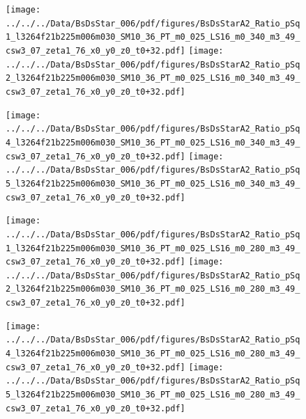 \documentclass[a4paper,10pt]{article}
\begin{document}
\begin{figure}[p]
 \texttt{[image: ../../../Data/BsDsStar\_006/pdf/figures/BsDsStarA2\_Ratio\_pSq1\_l3264f21b225m006m030\_SM10\_36\_PT\_m0\_025\_LS16\_m0\_340\_m3\_49\_csw3\_07\_zeta1\_76\_x0\_y0\_z0\_t0+32.pdf]} 
 \texttt{[image: ../../../Data/BsDsStar\_006/pdf/figures/BsDsStarA2\_Ratio\_pSq2\_l3264f21b225m006m030\_SM10\_36\_PT\_m0\_025\_LS16\_m0\_340\_m3\_49\_csw3\_07\_zeta1\_76\_x0\_y0\_z0\_t0+32.pdf]} 
 \end{figure}
\begin{figure}[p]
 \texttt{[image: ../../../Data/BsDsStar\_006/pdf/figures/BsDsStarA2\_Ratio\_pSq4\_l3264f21b225m006m030\_SM10\_36\_PT\_m0\_025\_LS16\_m0\_340\_m3\_49\_csw3\_07\_zeta1\_76\_x0\_y0\_z0\_t0+32.pdf]} 
 \texttt{[image: ../../../Data/BsDsStar\_006/pdf/figures/BsDsStarA2\_Ratio\_pSq5\_l3264f21b225m006m030\_SM10\_36\_PT\_m0\_025\_LS16\_m0\_340\_m3\_49\_csw3\_07\_zeta1\_76\_x0\_y0\_z0\_t0+32.pdf]} 
 \end{figure}
\begin{figure}[p]
 \texttt{[image: ../../../Data/BsDsStar\_006/pdf/figures/BsDsStarA2\_Ratio\_pSq1\_l3264f21b225m006m030\_SM10\_36\_PT\_m0\_025\_LS16\_m0\_280\_m3\_49\_csw3\_07\_zeta1\_76\_x0\_y0\_z0\_t0+32.pdf]} 
 \texttt{[image: ../../../Data/BsDsStar\_006/pdf/figures/BsDsStarA2\_Ratio\_pSq2\_l3264f21b225m006m030\_SM10\_36\_PT\_m0\_025\_LS16\_m0\_280\_m3\_49\_csw3\_07\_zeta1\_76\_x0\_y0\_z0\_t0+32.pdf]} 
 \end{figure}
\clearpage
\begin{figure}[p]
 \texttt{[image: ../../../Data/BsDsStar\_006/pdf/figures/BsDsStarA2\_Ratio\_pSq4\_l3264f21b225m006m030\_SM10\_36\_PT\_m0\_025\_LS16\_m0\_280\_m3\_49\_csw3\_07\_zeta1\_76\_x0\_y0\_z0\_t0+32.pdf]} 
 \texttt{[image: ../../../Data/BsDsStar\_006/pdf/figures/BsDsStarA2\_Ratio\_pSq5\_l3264f21b225m006m030\_SM10\_36\_PT\_m0\_025\_LS16\_m0\_280\_m3\_49\_csw3\_07\_zeta1\_76\_x0\_y0\_z0\_t0+32.pdf]} 
 \end{figure}
\clearpage
\end{document}
